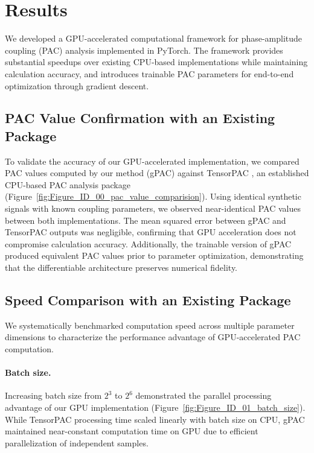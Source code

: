 
\section{Results}

We developed a GPU-accelerated computational framework for phase-amplitude coupling (PAC) analysis implemented in PyTorch. The framework provides substantial speedups over existing CPU-based implementations while maintaining calculation accuracy, and introduces trainable PAC parameters for end-to-end optimization through gradient descent.

\subsection{PAC Value Confirmation with an Existing Package}
To validate the accuracy of our GPU-accelerated implementation, we compared PAC values computed by our method (gPAC) against TensorPAC \cite{combrisson_tensorpac_2020}, an established CPU-based PAC analysis package (Figure~\ref{fig:Figure_ID_00_pac_value_comparision}). Using identical synthetic signals with known coupling parameters, we observed near-identical PAC values between both implementations. The mean squared error between gPAC and TensorPAC outputs was negligible, confirming that GPU acceleration does not compromise calculation accuracy. Additionally, the trainable version of gPAC produced equivalent PAC values prior to parameter optimization, demonstrating that the differentiable architecture preserves numerical fidelity.

\subsection{Speed Comparison with an Existing Package}
We systematically benchmarked computation speed across multiple parameter dimensions to characterize the performance advantage of GPU-accelerated PAC computation.

\paragraph{Batch size.} Increasing batch size from $2^3$ to $2^6$ demonstrated the parallel processing advantage of our GPU implementation (Figure~\ref{fig:Figure_ID_01_batch_size}). While TensorPAC processing time scaled linearly with batch size on CPU, gPAC maintained near-constant computation time on GPU due to efficient parallelization of independent samples.

